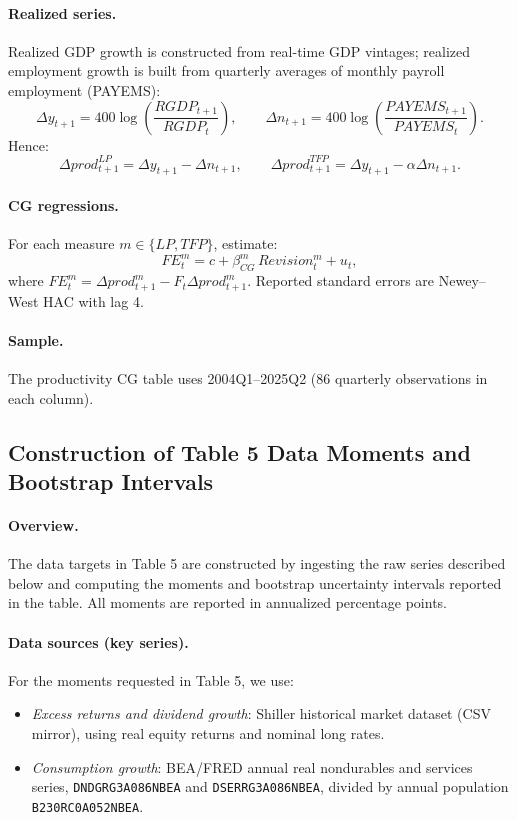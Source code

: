 \paragraph{Realized series.}
Realized GDP growth is constructed from real-time GDP vintages; realized employment growth is built from quarterly averages of monthly payroll employment (PAYEMS):
\[
\Delta y_{t+1}=400\log\!\left(\frac{RGDP_{t+1}}{RGDP_t}\right),\qquad
\Delta n_{t+1}=400\log\!\left(\frac{PAYEMS_{t+1}}{PAYEMS_t}\right).
\]
Hence:
\[
\Delta prod^{LP}_{t+1}=\Delta y_{t+1}-\Delta n_{t+1},\qquad
\Delta prod^{TFP}_{t+1}=\Delta y_{t+1}-\alpha\Delta n_{t+1}.
\]

\paragraph{CG regressions.}
For each measure \(m\in\{LP,TFP\}\), estimate:
\[
FE^m_t = c + \beta_{CG}^m\,Revision^m_t + u_t,
\]
where \(FE^m_t=\Delta prod^m_{t+1}-F_t\Delta prod^m_{t+1}\).
Reported standard errors are Newey--West HAC with lag 4.

\paragraph{Sample.}
The productivity CG table uses 2004Q1--2025Q2 (86 quarterly observations in each column).

\subsection{Construction of Table 5 Data Moments and Bootstrap Intervals}\label{app:data_table5_moments}

\paragraph{Overview.}
The data targets in Table 5 are constructed by ingesting the raw series described below and computing the moments and bootstrap uncertainty intervals reported in the table.
All moments are reported in annualized percentage points.

\paragraph{Data sources (key series).}
For the moments requested in Table 5, we use:
\begin{itemize}
\item \textit{Excess returns and dividend growth}: Shiller historical market dataset (CSV mirror), using real equity returns and nominal long rates.
\item \textit{Consumption growth}: BEA/FRED annual real nondurables and services series, \texttt{DNDGRG3A086NBEA} and \texttt{DSERRG3A086NBEA}, divided by annual population \texttt{B230RC0A052NBEA}.
\end{itemize}

